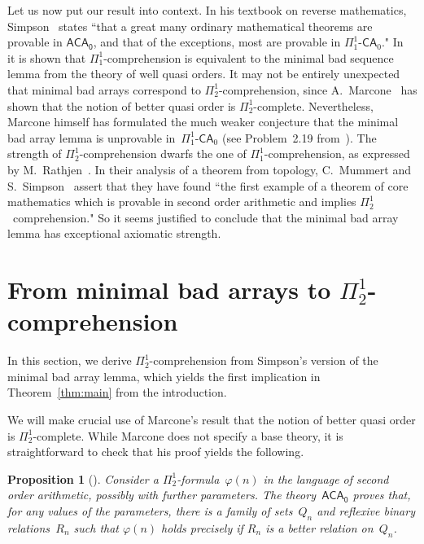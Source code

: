 \documentclass{amsart}
\numberwithin{theorem}{section}
\newtheorem{proposition}[theorem]{Proposition}
\theoremstyle{definition}
\begin{document}
Let us now put our result into context. In his textbook on reverse mathematics, Simpson~\cite{simpson09} states ``that a great many ordinary mathematical theorems are provable in $\mathsf{ACA_0}$, and that of the exceptions, most are provable in $\Pi^1_1\textsf{-CA}_0$." In~\cite{marcone-bad-sequence} it is shown that $\Pi^1_1$-comprehension is equivalent to the minimal bad sequence lemma from the theory of well quasi orders. It may not be entirely unexpected that minimal bad arrays correspond to $\Pi^1_2$-comprehension, since A.~Marcone~\cite{marcone-bad-sequence} has shown that the notion of better quasi order is $\Pi^1_2$-complete. Nevertheless, Marcone himself has formulated the much weaker conjecture that the minimal bad array lemma is unprovable in~$\Pi^1_1\textsf{-CA}_0$ (see Problem~2.19 from~\cite{marcone-survey-old}). The strength of $\Pi^1_2$-comprehension dwarfs the one of $\Pi^1_1$-comprehension, as expressed by M.~Rathjen~\cite{rathjen-icm}. In their analysis of a theorem from topology, C.~Mummert and S.~Simpson~\cite{mummert-simpson} assert that they have found ``the first example of a theorem of core mathematics which is provable in second order arithmetic and implies $\Pi^1_2$~comprehension." So it seems justified to conclude that the minimal bad array lemma has exceptional axiomatic strength.


\section{From minimal bad arrays to $\Pi^1_2$-comprehension}

In this section, we derive $\Pi^1_2$-comprehension from Simpson's version of the minimal bad array lemma, which yields the first implication in Theorem~\ref{thm:main} from the introduction.

We will make crucial use of Marcone's result that the notion of better quasi order is $\Pi^1_2$-complete. While Marcone does not specify a base theory, it is straightforward to check that his proof yields the following.

\begin{proposition}[{\cite{marcone-Pi12-complete}}]\label{prop:Pi12-complete}
Consider a $\Pi^1_2$-formula~$\varphi(n)$ in the language of second order arithmetic, possibly with further parameters. The theory~$\mathsf{ACA_0}$ proves that, for any values of the parameters, there is a family of sets~$Q_n$ and reflexive binary relations~$R_n$ such that $\varphi(n)$ holds precisely if $R_n$ is a better relation on~$Q_n$.
\end{proposition}
\end{document}
